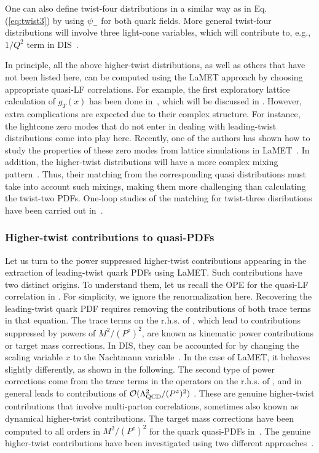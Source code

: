 One can also define twist-four distributions in a similar way as in Eq. (\ref{eq:twist3})
by using $\psi_-$ for both quark fields. More general twist-four distributions
will involve three light-cone variables, which will contribute to, e.g.,
$1/Q^2$ term in DIS~\cite{Jaffe:1982pm,Ellis:1982cd,Jaffe:1991ra,Ji:1993ey}.

In principle, all the above higher-twist distributions, as well as others that have not been listed here, can be
computed using the LaMET approach by choosing appropriate quasi-LF correlations. For example, the first exploratory lattice calculation of $g_T(x)$ has been done in~\cite{Bhattacharya:2020cen}, which will be discussed in . However, extra complications are expected due to their complex structure. For instance, the lightcone zero modes that do not enter in dealing with leading-twist distributions come into play here. Recently, one of the authors has shown how to study the properties of these zero modes from lattice simulations in LaMET~\cite{Ji:2020baz}. In addition, the higher-twist distributions will have a more complex mixing pattern~\cite{Ji:1990br,Balitsky:1996uh}. Thus,
their matching from the corresponding quasi distributions must take into account such
mixings, making them more challenging than calculating the twist-two PDFs.  One-loop studies of the matching for twist-three disributions have been carried out in~\cite{Bhattacharya:2020xlt,Bhattacharya:2020jfj}.


\subsubsection{Higher-twist contributions to quasi-PDFs}

Let us turn to the power suppressed higher-twist contributions appearing in the extraction of leading-twist quark PDFs using LaMET. Such contributions have two distinct origins. To understand them, let us recall the OPE for the quasi-LF correlation in . For simplicity, we ignore the renormalization here.
%
Recovering the leading-twist quark PDF requires removing the contributions of both trace terms in that equation.
The trace terms on the r.h.s. of , which lead to contributions suppressed by powers of $M^2/(P^z)^2$, are known as kinematic power contributions or target mass corrections. In DIS, they can be accounted for by changing the scaling variable $x$ to the Nachtmann variable~\cite{Nachtmann:1973mr}. In the case of LaMET, it behaves slightly differently, as shown in the following. The second type of power corrections come from the trace terms in the operators on the r.h.s. of , and in general leads to contributions of $\mathcal O(\Lambda^2_{\rm{QCD}}/(P^z)^2)$ . These are genuine higher-twist contributions that involve multi-parton correlations, sometimes also known as dynamical higher-twist contributions. The target mass corrections have been computed to all orders in $M^2/(P^z)^2$ for the quark quasi-PDFs in~\cite{Chen:2016utp,Radyushkin:2017ffo}. The genuine higher-twist contributions have been investigated using two different approaches~\cite{Chen:2016utp,Braun:2018brg}.


